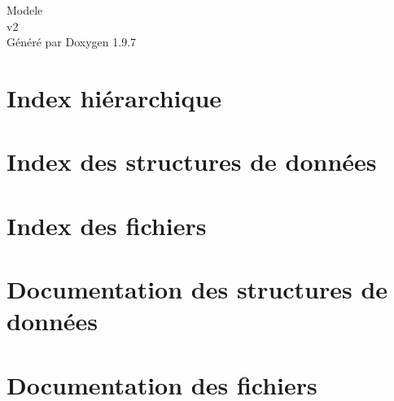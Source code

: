 \documentclass[twoside]{book}
\newcommand{\+}{\discretionary{\mbox{\scriptsize$\hookleftarrow$}}{}{}}
\newcommand{\clearemptydoublepage}{%
    \newpage{\pagestyle{empty}\cleardoublepage}%
  }
\begin{document}
  \raggedbottom
    \hypersetup{pageanchor=false,
                bookmarksnumbered=true,
                pdfencoding=unicode
               }
  \begin{titlepage}
  \vspace*{7cm}
  \begin{center}%
  {\Large Modele}\\
  [1ex]\large v2 \\
  \vspace*{1cm}
  {\large Généré par Doxygen 1.9.7}\\
  \end{center}
  \end{titlepage}
  \clearemptydoublepage
  \tableofcontents
  \clearemptydoublepage
  \hypersetup{pageanchor=true}
\chapter{Index hiérarchique}

\chapter{Index des structures de données}

\chapter{Index des fichiers}

\chapter{Documentation des structures de données}


\chapter{Documentation des fichiers}


  \backmatter
  \newpage
  \clearemptydoublepage
  \printindex
\end{document}
